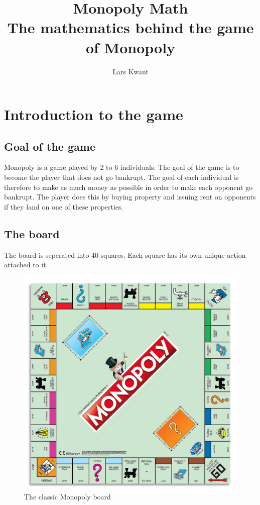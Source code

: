 \documentclass{article}
\title{Monopoly Math \\ \large The mathematics behind the game of Monopoly }
\author{Lars Kwant}
\begin{document}
\maketitle

\tableofcontents

\newpage

\section{Introduction to the game}
\subsection{Goal of the game}
Monopoly is a game played by 2 to 6 individuals. The goal of the game is to become the player that does not go bankrupt. The goal of each individual is therefore to make as much money as possible in order to make each opponent go bankrupt. The player does this by buying property and issuing rent on opponents if they land on one of these properties.\\

\subsection{The board}
The board is seperated into 40 squares. Each square has its own unique action attached to it. 
\begin{figure}[h]
\centering
\includegraphics[width = \textwidth]{images/board.jpg}
\caption{The classic Monopoly board \cite{mon_board_image}}
\end{figure}
\end{document}
